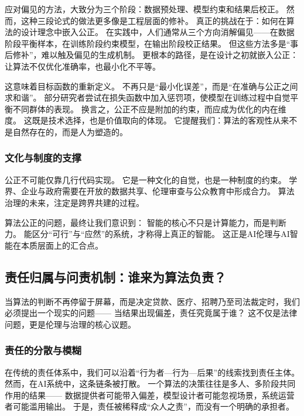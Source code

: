 应对偏见的方法，大致分为三个阶段：数据预处理、模型约束和结果后校正。  
然而，这种三段论式的做法更多像是工程层面的修补。  
真正的挑战在于：如何在算法的设计理念中嵌入公正。  
在实践中，人们通常从三个方向消解偏见——在数据阶段平衡样本，在训练阶段约束模型，在输出阶段校正结果。  
但这些方法多是“事后修补”，难以触及偏见的生成机制。  
更根本的路径，是在设计之初就嵌入公正：让算法不仅优化准确率，也最小化不平等。

这意味着目标函数的重新定义。  
不再只是“最小化误差”，而是“在准确与公正之间求和谐”。  
部分研究者尝试在损失函数中加入惩罚项，使模型在训练过程中自觉平衡不同群体的表现。  
换言之，公正不应是附加的约束，而应成为优化的内在维度。  
这既是技术选择，也是价值取向的体现。  
它提醒我们：算法的客观性从来不是自然存在的，而是人为塑造的。

\subsubsection{文化与制度的支撑}

公正不可能仅靠几行代码实现。  
它是一种文化的自觉，也是一种制度的约束。  
学界、企业与政府需要在开放的数据共享、伦理审查与公众教育中形成合力。  
算法治理的未来，注定是跨界共建的过程。

算法公正的问题，最终让我们意识到：  
智能的核心不只是计算能力，而是判断力。  
能区分“可行”与“应然”的系统，才称得上真正的智能。  
这正是AI伦理与AI智能在本质层面上的汇合点。

\subsection{责任归属与问责机制：谁来为算法负责？}

当算法的判断不再停留于屏幕，而是决定贷款、医疗、招聘乃至司法裁定时，我们必须提出一个现实的问题——  
当结果出现偏差，责任究竟属于谁？  
这不仅是法律问题，更是伦理与治理的核心议题。

\subsubsection{责任的分散与模糊}

在传统的责任体系中，我们可以沿着“行为者—行为—后果”的线索找到责任主体。  
然而，在AI系统中，这条链条被打散。  
一个算法的决策往往是多人、多阶段共同作用的结果——  
数据提供者可能带入偏差，模型设计者可能忽视场景，系统运营者可能滥用输出。  
于是，责任被稀释成“众人之责”，而没有一个明确的承担者。

